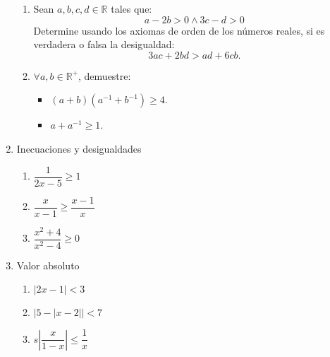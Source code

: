 \documentclass[12pt]{article}
\begin{document}
\begin{enumerate}
\begin{enumerate}
                  \item Sean $a,b,c,d\in\mathbb{R}$ tales que: $$a-2b>0 \wedge 3c-d>0$$ Determine usando los axiomas de orden de los números reales, si es verdadera o falsa la desigualdad: $$3ac+2bd>ad+6cb.$$
                  \item $\forall a,b \in\mathbb{R}^{+}$, demuestre:
                        \begin{itemize}
                              \item $(a+b)(a^{-1}+b^{-1})\geq4$.
                              \item $a+a^{-1}\geq1$.
                        \end{itemize}
            \end{enumerate}
      \item Inecuaciones y desigualdades
            \begin{enumerate}
                  \item $\dfrac{1}{2x-5}\geq1$
                  \item $\dfrac{x}{x-1}\geq \dfrac{x-1}{x}$ %
                  \item $\dfrac{x^{2}+4}{x^{2}-4}\geq0$
            \end{enumerate}
      \item Valor absoluto
            \begin{enumerate}
                  \item $|{2x-1}|<3$
                  \item $|{5-|{x-2}|}|<7$
                  \item $s\left|{\dfrac{x}{1-x}}\right|\leq\dfrac{1}{x}$
            \end{enumerate}
\end{enumerate}
\end{document}
